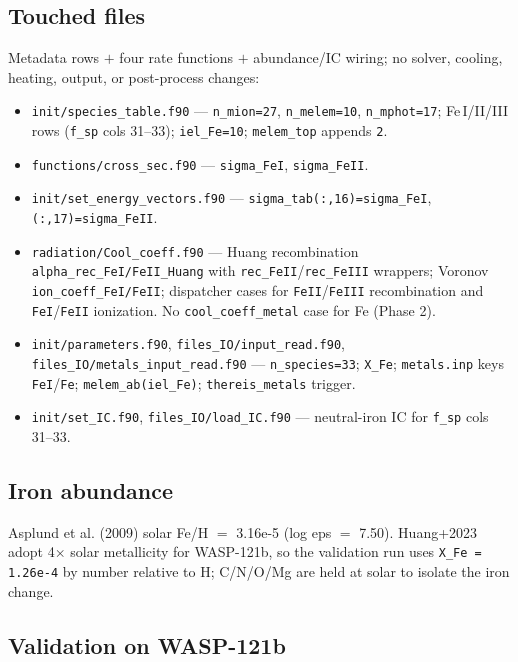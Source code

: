 \documentclass[english,a4paper]{kiseon_memo}
\begin{document}
\subsection{Touched files}

Metadata rows $+$ four rate functions $+$ abundance/IC wiring; no solver, cooling,
heating, output, or post-process changes:
\begin{itemize}
\item \texttt{init/species\_table.f90} --- \verb|n_mion=27|, \verb|n_melem=10|,
  \verb|n_mphot=17|; Fe\,I/II/III rows (\verb|f_sp| cols 31--33); \verb|iel_Fe=10|;
  \verb|melem_top| appends \verb|2|.
\item \texttt{functions/cross\_sec.f90} --- \verb|sigma_FeI|, \verb|sigma_FeII|.
\item \texttt{init/set\_energy\_vectors.f90} --- \verb|sigma_tab(:,16)=sigma_FeI|,
  \verb|(:,17)=sigma_FeII|.
\item \texttt{radiation/Cool\_coeff.f90} --- Huang recombination
  \verb|alpha_rec_FeI/FeII_Huang| with \verb|rec_FeII|/\verb|rec_FeIII| wrappers;
  Voronov \verb|ion_coeff_FeI/FeII|; dispatcher cases for \verb|FeII|/\verb|FeIII|
  recombination and \verb|FeI|/\verb|FeII| ionization. No \verb|cool_coeff_metal|
  case for Fe (Phase 2).
\item \texttt{init/parameters.f90}, \texttt{files\_IO/input\_read.f90},
  \texttt{files\_IO/metals\_input\_read.f90} --- \verb|n_species=33|; \verb|X_Fe|;
  \texttt{metals.inp} keys \verb|FeI|/\verb|Fe|; \verb|melem_ab(iel_Fe)|;
  \verb|thereis_metals| trigger.
\item \texttt{init/set\_IC.f90}, \texttt{files\_IO/load\_IC.f90} --- neutral-iron
  IC for \verb|f_sp| cols 31--33.
\end{itemize}

\subsection{Iron abundance}

Asplund et al. (2009) solar Fe/H $=$ 3.16e-5 (log eps $=$ 7.50). Huang+2023 adopt
4$\times$ solar metallicity for WASP-121b, so the validation run uses
\verb|X_Fe = 1.26e-4| by number relative to H; C/N/O/Mg are held at solar to
isolate the iron change.

\subsection{Validation on WASP-121b}
\end{document}
